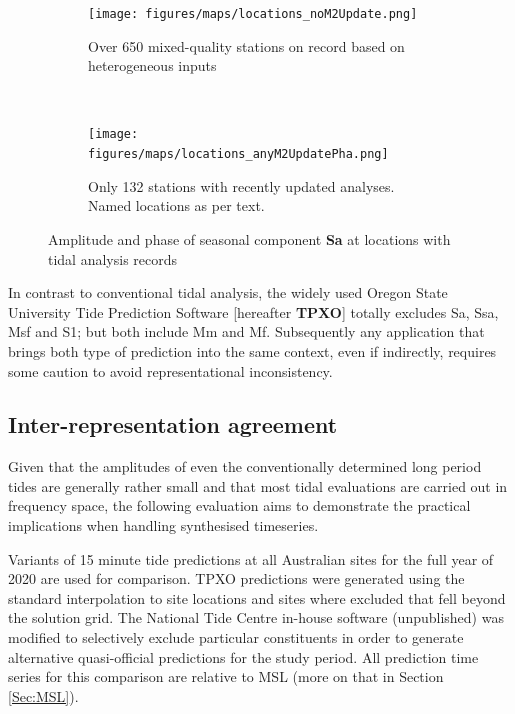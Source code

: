 \begin{figure}[H]\centering
    \begin{subfigure}[b]{\figwidthFull}
        \texttt{[image: figures/maps/locations\_noM2Update.png]} \caption{Over 650 mixed-quality stations on record based on heterogeneous inputs}
    \end{subfigure}
    \\
    \begin{subfigure}[b]{\figwidthFull}
        \texttt{[image: figures/maps/locations\_anyM2UpdatePha.png]} \caption{Only 132 stations with recently updated analyses. Named locations as per text.}
    \end{subfigure}
    \caption{Amplitude and phase of seasonal component \textbf{Sa} at locations with tidal analysis records}
    \label{fig:SaAmp}
\end{figure}   

In contrast to conventional tidal analysis, the widely used Oregon State University Tide Prediction Software \citep{Egbert:2002ug} [hereafter \textbf{TPXO}] totally excludes Sa, Ssa, Msf and S1; but both include Mm and Mf.  Subsequently any application that brings both type of prediction into the same context, even if indirectly, requires some caution to avoid representational inconsistency. 


\subsection{Inter-representation agreement}
Given that the amplitudes of even the conventionally determined long period tides are generally rather small and that most tidal evaluations are carried out in frequency space, the following evaluation aims to demonstrate the practical implications when handling synthesised timeseries.

Variants of 15 minute tide predictions at all Australian sites for the full year of 2020 are used for comparison.   TPXO predictions were generated using the standard interpolation to site locations and sites where excluded that fell beyond the solution grid.   The National Tide Centre in-house software (unpublished) was modified to selectively exclude particular constituents in order to generate alternative quasi-official predictions for the study period.  All prediction time series for this comparison are relative to MSL (more on that in Section \ref{Sec:MSL}).  

